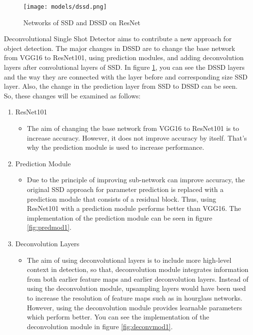 \documentclass{article}
\begin{document}
\setlength{\parindent}{6ex}

\begin{figure}
    \centering
    \texttt{[image: models/dssd.png]}
    \caption{Networks of SSD and DSSD on ResNet \cite{dssdcite}}
    \label{fig:dssd1}
\end{figure}

\indent

Deconvolutional Single Shot Detector \cite{dssdcite} aims to contribute a new approach for object 
detection. The major changes in DSSD are to change the base network from VGG16 to 
ResNet101, using prediction modules, and adding deconvolution layers after convolutional 
layers of SSD. In figure \ref{fig:dssd1}, you can see the DSSD layers and the way they are 
connected with the layer before and corresponding size SSD layer. Also, the change in 
the prediction layer from SSD to DSSD can be seen. So, these changes will be examined as follows: 
\begin{enumerate}
    \item ResNet101
    \begin{itemize}
        \item The aim of changing the base network from VGG16 to ResNet101 is to 
increase accuracy. However, it does not improve accuracy by itself. That's why 
the prediction module is used to increase performance.
    \end{itemize}
    \item Prediction Module
    \begin{itemize}
        \item Due to the principle of improving sub-network can improve accuracy, 
the original SSD approach for parameter prediction is replaced with a prediction module that 
consists of a residual block. Thus, using ResNet101 with a prediction module performs 
better than VGG16. The implementation of the prediction module can be seen in figure 
\ref{fig:predmod1}.
    \end{itemize}
    \item Deconvolution Layers
    \begin{itemize}
        \item The aim of using deconvolutional layers is to include more high-level 
context in detection, so that, deconvolution module integrates information from both 
earlier feature maps and earlier deconvolution layers. Instead of using the deconvolution 
module, upsampling layers would have been used to increase the resolution of feature 
maps such as in hourglass networks. However, using the deconvolution module provides 
learnable parameters which perform better. You can see the implementation of 
the deconvolution module in figure \ref{fig:deconvmod1}.
    \end{itemize}
\end{enumerate}
\end{document}
